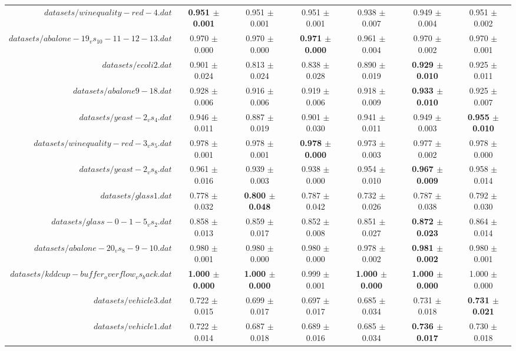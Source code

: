 \begin{table}[!ht]
{\begin{tabular}{r c c c c c c}
$datasets/winequality-red-4.dat$ & \textbf{0.951 $\pm$ 0.001} & 0.951 $\pm$ 0.001 & 0.951 $\pm$ 0.001 & 0.938 $\pm$ 0.007 & 0.949 $\pm$ 0.004 & 0.951 $\pm$ 0.002 \\
$datasets/abalone-19_vs_10-11-12-13.dat$ & 0.970 $\pm$ 0.000 & 0.970 $\pm$ 0.000 & \textbf{0.971 $\pm$ 0.000} & 0.961 $\pm$ 0.004 & 0.970 $\pm$ 0.002 & 0.970 $\pm$ 0.001 \\
$datasets/ecoli2.dat$ & 0.901 $\pm$ 0.024 & 0.813 $\pm$ 0.024 & 0.838 $\pm$ 0.028 & 0.890 $\pm$ 0.019 & \textbf{0.929 $\pm$ 0.010} & 0.925 $\pm$ 0.011 \\
$datasets/abalone9-18.dat$ & 0.928 $\pm$ 0.006 & 0.916 $\pm$ 0.006 & 0.919 $\pm$ 0.006 & 0.918 $\pm$ 0.009 & \textbf{0.933 $\pm$ 0.010} & 0.925 $\pm$ 0.007 \\
$datasets/yeast-2_vs_4.dat$ & 0.946 $\pm$ 0.011 & 0.887 $\pm$ 0.019 & 0.901 $\pm$ 0.030 & 0.941 $\pm$ 0.011 & 0.949 $\pm$ 0.003 & \textbf{0.955 $\pm$ 0.010} \\
$datasets/winequality-red-3_vs_5.dat$ & 0.978 $\pm$ 0.001 & 0.978 $\pm$ 0.001 & \textbf{0.978 $\pm$ 0.000} & 0.973 $\pm$ 0.003 & 0.977 $\pm$ 0.002 & 0.978 $\pm$ 0.000 \\
$datasets/yeast-2_vs_8.dat$ & 0.961 $\pm$ 0.016 & 0.939 $\pm$ 0.003 & 0.938 $\pm$ 0.000 & 0.954 $\pm$ 0.010 & \textbf{0.967 $\pm$ 0.009} & 0.958 $\pm$ 0.014 \\
$datasets/glass1.dat$ & 0.778 $\pm$ 0.032 & \textbf{0.800 $\pm$ 0.048} & 0.787 $\pm$ 0.042 & 0.732 $\pm$ 0.026 & 0.787 $\pm$ 0.038 & 0.792 $\pm$ 0.030 \\
$datasets/glass-0-1-5_vs_2.dat$ & 0.858 $\pm$ 0.013 & 0.859 $\pm$ 0.017 & 0.852 $\pm$ 0.008 & 0.851 $\pm$ 0.027 & \textbf{0.872 $\pm$ 0.023} & 0.864 $\pm$ 0.014 \\
$datasets/abalone-20_vs_8-9-10.dat$ & 0.980 $\pm$ 0.001 & 0.980 $\pm$ 0.000 & 0.980 $\pm$ 0.000 & 0.978 $\pm$ 0.002 & \textbf{0.981 $\pm$ 0.002} & 0.980 $\pm$ 0.001 \\
$datasets/kddcup-buffer_overflow_vs_back.dat$ & \textbf{1.000 $\pm$ 0.000} & \textbf{1.000 $\pm$ 0.000} & 0.999 $\pm$ 0.001 & \textbf{1.000 $\pm$ 0.000} & \textbf{1.000 $\pm$ 0.000} & 1.000 $\pm$ 0.000 \\
$datasets/vehicle3.dat$ & 0.722 $\pm$ 0.015 & 0.699 $\pm$ 0.017 & 0.697 $\pm$ 0.017 & 0.685 $\pm$ 0.034 & 0.731 $\pm$ 0.018 & \textbf{0.731 $\pm$ 0.021} \\
$datasets/vehicle1.dat$ & 0.722 $\pm$ 0.014 & 0.687 $\pm$ 0.018 & 0.689 $\pm$ 0.016 & 0.685 $\pm$ 0.034 & \textbf{0.736 $\pm$ 0.017} & 0.730 $\pm$ 0.018 \\

\end{tabular}}
\end{table}
